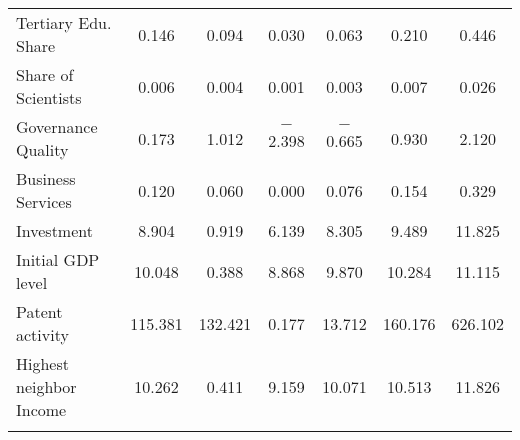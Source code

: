 \documentclass[11pt]{article}
\begin{document}
\begin{table}[!htbp]
\begin{tabular}{@{\extracolsep{5pt}}lcccccc}
Tertiary Edu. Share & 0.146 & 0.094 & 0.030 & 0.063 & 0.210 & 0.446 \\ 
Share of Scientists & 0.006 & 0.004 & 0.001 & 0.003 & 0.007 & 0.026 \\ 
Governance Quality & 0.173 & 1.012 & $-$2.398 & $-$0.665 & 0.930 & 2.120 \\  
Business Services & 0.120 & 0.060 & 0.000 & 0.076 & 0.154 & 0.329 \\ 
Investment & 8.904 & 0.919 & 6.139 & 8.305 & 9.489 & 11.825 \\  
Initial GDP level & 10.048 & 0.388 & 8.868 & 9.870 & 10.284 & 11.115 \\ 
Patent activity  & 115.381 & 132.421 & 0.177 & 13.712 & 160.176 & 626.102 \\ 
Highest neighbor Income & 10.262 & 0.411 & 9.159 & 10.071 & 10.513 & 11.826 \\ 
\hline \\[-1.8ex] 
\end{tabular} 
\end{table} 
\end{document}
